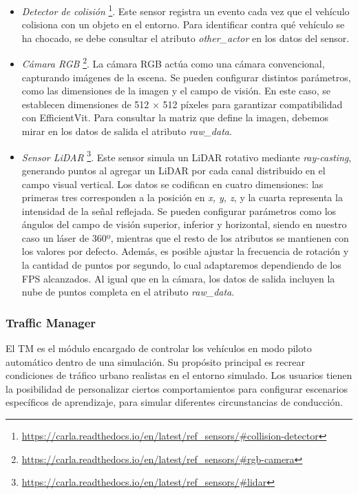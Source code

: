 \begin{itemize}
\item \textit{Detector de colisión} \footnote{\url{https://carla.readthedocs.io/en/latest/ref_sensors/\#collision-detector}}. Este sensor registra un evento cada vez que el vehículo colisiona con un objeto en el entorno. Para identificar contra qué vehículo se ha chocado, se debe consultar el atributo \textit{other\_actor} en los datos del sensor.

\item \textit{Cámara RGB} \footnote{\url{https://carla.readthedocs.io/en/latest/ref_sensors/\#rgb-camera}}. La cámara RGB actúa como una cámara convencional, capturando imágenes de la escena. Se pueden configurar distintos parámetros, como las dimensiones de la imagen y el campo de visión. En este caso, se establecen dimensiones de 512 × 512 píxeles para garantizar compatibilidad con EfficientVit. Para consultar la matriz que define la imagen, debemos mirar en los datos de salida el atributo \textit{raw\_data}.

\item \textit{Sensor \ac{LiDAR}} \footnote{\url{https://carla.readthedocs.io/en/latest/ref_sensors/\#lidar}}. Este sensor simula un \ac{LiDAR} rotativo mediante \textit{ray-casting}, generando puntos al agregar un \ac{LiDAR} por cada canal distribuido en el campo visual vertical. Los datos se codifican en cuatro dimensiones: las primeras tres corresponden a la posición en \textit{x, y, z}, y la cuarta representa la intensidad de la señal reflejada. Se pueden configurar parámetros como los ángulos del campo de visión superior, inferior y horizontal, siendo en nuestro caso un láser de 360º, mientras que el resto de los atributos se mantienen con los valores por defecto. Además, es posible ajustar la frecuencia de rotación y la cantidad de puntos por segundo, lo cual adaptaremos dependiendo de los \ac{FPS} alcanzados. Al igual que en la cámara, los datos de salida incluyen la nube de puntos completa en el atributo \textit{raw\_data}.
\end{itemize}

\subsubsection{Traffic Manager}

El \ac{TM} es el módulo encargado de controlar los vehículos en modo piloto automático dentro de una simulación. Su propósito principal es recrear condiciones de tráfico urbano realistas en el entorno simulado. Los usuarios tienen la posibilidad de personalizar ciertos comportamientos para configurar escenarios específicos de aprendizaje, para simular diferentes circunstancias de conducción.

